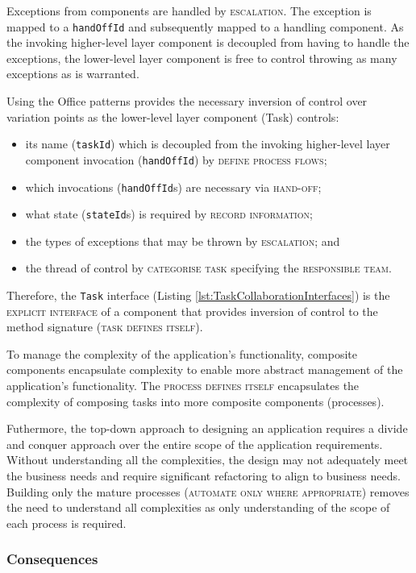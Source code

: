 \documentclass[prodmode]{style/acmlarge}
\begin{document}
Exceptions from components are handled by \textsc{escalation}.  The
exception is mapped to a \texttt{handOffId} and subsequently mapped to a
handling component.  As the invoking higher-level layer component is decoupled
from having to handle the exceptions, the lower-level layer component is free to
control throwing as many exceptions as is warranted.

Using the Office patterns provides the necessary inversion of control over
variation points as the lower-level layer component (Task) controls:
\begin{itemize}
  \item its name (\texttt{taskId}) which is decoupled from the invoking higher-level layer component invocation (\texttt{handOffId}) by \textsc{define process flows};
  \item which invocations (\texttt{handOffId}s) are necessary via \textsc{hand-off};
  \item what state (\texttt{stateId}s) is required by \textsc{record information};
  \item the types of exceptions that may be thrown by \textsc{escalation}; and
  \item the thread of control by \textsc{categorise task} specifying the \textsc{responsible team}.
\end{itemize}

Therefore, the \texttt{Task} interface (Listing
\ref{lst:TaskCollaborationInterfaces}) is the \textsc{explicit interface} of a
component that provides inversion of control to the method signature
(\textsc{task defines itself}).

To manage the complexity of the application's functionality, composite
components encapsulate complexity to enable more abstract management of the
application's functionality.  The \textsc{process defines itself} encapsulates
the complexity of composing tasks into more composite components (processes).

Futhermore, the top-down approach to designing an application requires a divide
and conquer approach over the entire scope of the application requirements.
Without understanding all the complexities, the design may not adequately meet
the business needs and require significant refactoring to align to business
needs.  Building only the mature processes (\textsc{automate only where
appropriate}) removes the need to understand all complexities as only
understanding of the scope of each process is required.


\subsubsection*{Consequences}
\end{document}
